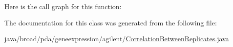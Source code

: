 Here is the call graph for this function\+:




The documentation for this class was generated from the following file\+:\begin{DoxyCompactItemize}
\item 
java/broad/pda/geneexpression/agilent/\hyperlink{_correlation_between_replicates_8java}{Correlation\+Between\+Replicates.\+java}\end{DoxyCompactItemize}

